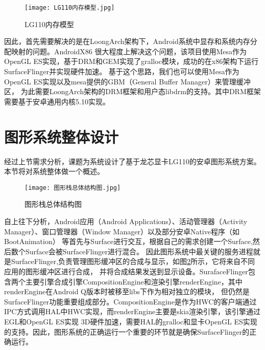 \begin{figure}
  \centering
  \texttt{[image: LG110内存模型.jpg]}
  \caption{LG110内存模型}
  \label{fig:LG110内存模型}
\end{figure}

因此，首先需要解决的是在LoongArch架构下，Android系统中显存和系统内存分配映射的问题。AndroidX86\cite{AndroidX86}
很大程度上解决这个问题，该项目使用Mesa作为OpenGL ES实现，基于DRM和GEM实现了gralloc模块，成功的在x86架构下运行SurfaceFlinger并实现硬件加速\cite{XTYY201710015}。
基于这个思路，我们也可以使用Mesa作为OpenGL ES实现以及mesa提供的GBM（General Buffer Manager）来管理缓冲区，
为此需要LoongArch架构的DRM框架和用户态libdrm的支持。其中DRM框架需要基于安卓通用内核5.10实现。

\section{图形系统整体设计}
经过上节需求分析，课题为系统设计了基于龙芯显卡LG110的安卓图形系统方案。本节将对系统整体做一个概述。

\begin{figure}[h]
  \centering
  \texttt{[image: 图形栈总体结构图.jpg]}
  \caption{图形栈总体结构图}    
  \label{fig:图形栈总体结构图}
\end{figure}

自上往下分析，Android应用（Android Applications）、活动管理器（Activity Manager）、窗口管理器（Window Manager）以及部分安卓Native程序（如BootAnimation）
等首先与Surface进行交互，根据自己的需求创建一个Surface,然后数个Surface会被SurfaceFlinger进行混合\cite{邓凡平2011深入理解}。
因此图形系统中最关键的服务进程就是SurfaceFlinger,负责管理图形缓冲区的合成与显示，如图\ref{fig:图形栈总体结构图}所示，它将来自不同应用的图形缓冲区进行合成，
并将合成结果发送到显示设备。SurafaceFlinger包含两个主要引擎合成引擎CompositionEngine和渲染引擎renderEngine，其中renderEngine在Android Q版本时被移至libs下作为相对独立的模块，
但仍然是SurfaceFlinger功能重要组成部分。CompositionEngine是作为HWC的客户端通过IPC方式调用HAL中HWC实现，而renderEngine主要是skia渲染引擎，该引擎通过EGL和OpenGL ES实现
3D硬件加速，需要HAL的gralloc和显卡OpenGL ES实现的支持。因此，图形系统的正确运行一个重要的环节就是确保SurfaceFlinger的正确运行。

